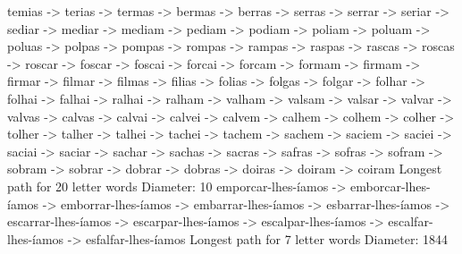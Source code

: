 \documentclass[a4paper,11pt]{article}
\begin{document}
temias -> terias -> termas -> bermas -> berras -> serras -> serrar -> seriar -> sediar -> mediar -> mediam -> pediam -> podiam -> poliam -> poluam -> poluas -> polpas -> pompas -> rompas -> rampas -> raspas -> rascas -> roscas -> roscar -> foscar -> foscai -> forcai -> forcam -> formam -> firmam -> firmar -> filmar -> filmas -> filias -> folias -> folgas -> folgar -> folhar -> folhai -> falhai -> ralhai -> ralham -> valham -> valsam -> valsar -> valvar -> valvas -> calvas -> calvai -> calvei -> calvem -> calhem -> colhem -> colher -> tolher -> talher -> talhei -> tachei -> tachem -> sachem -> saciem -> saciei -> saciai -> saciar -> sachar -> sachas -> sacras -> safras -> sofras -> sofram -> sobram -> sobrar -> dobrar -> dobras -> doiras -> doiram -> coiram
Longest path for 20 letter words
Diameter: 10
emporcar-lhes-íamos -> emborcar-lhes-íamos -> emborrar-lhes-íamos -> embarrar-lhes-íamos -> esbarrar-lhes-íamos -> escarrar-lhes-íamos -> escarpar-lhes-íamos -> escalpar-lhes-íamos -> escalfar-lhes-íamos -> esfalfar-lhes-íamos
Longest path for 7 letter words
Diameter: 1844
\end{document}
